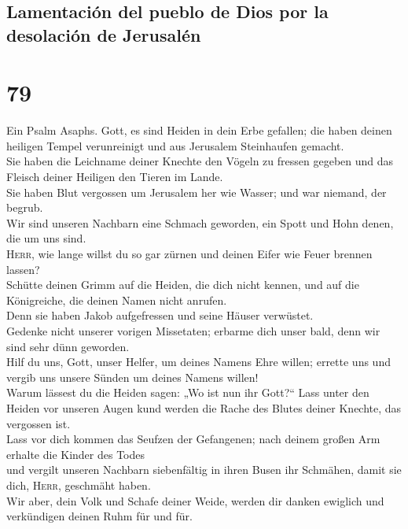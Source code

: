 \hypertarget{lamentaciuxf3n-del-pueblo-de-dios-por-la-desolaciuxf3n-de-jerusaluxe9n}{%
\subsection{Lamentación del pueblo de Dios por la desolación de
Jerusalén}\label{lamentaciuxf3n-del-pueblo-de-dios-por-la-desolaciuxf3n-de-jerusaluxe9n}}

\hypertarget{section-78}{%
\section{79}\label{section-78}}

 Ein Psalm Asaphs. Gott, es sind Heiden in dein Erbe
gefallen; die haben deinen heiligen Tempel verunreinigt und aus
Jerusalem Steinhaufen gemacht.\\
 Sie haben die Leichname deiner Knechte den Vögeln zu
fressen gegeben und das Fleisch deiner Heiligen den Tieren im Lande.\\
 Sie haben Blut vergossen um Jerusalem her wie Wasser; und
war niemand, der begrub.\\
 Wir sind unseren Nachbarn eine Schmach geworden, ein
Spott und Hohn denen, die um uns sind.\\
 \textsc{Herr}, wie lange willst du so gar zürnen und
deinen Eifer wie Feuer brennen lassen?\\
 Schütte deinen Grimm auf die Heiden, die dich nicht
kennen, und auf die Königreiche, die deinen Namen nicht anrufen.\\
 Denn sie haben Jakob aufgefressen und seine Häuser
verwüstet.\\
 Gedenke nicht unserer vorigen Missetaten; erbarme dich
unser bald, denn wir sind sehr dünn geworden.\\
 Hilf du uns, Gott, unser Helfer, um deines Namens Ehre
willen; errette uns und vergib uns unsere Sünden um deines Namens
willen!\\
 Warum lässest du die Heiden sagen: „Wo ist nun ihr
Gott?{}`` Lass unter den Heiden vor unseren Augen kund werden die Rache
des Blutes deiner Knechte, das vergossen ist.\\
 Lass vor dich kommen das Seufzen der Gefangenen; nach
deinem großen Arm erhalte die Kinder des Todes\\
 und vergilt unseren Nachbarn siebenfältig in ihren Busen
ihr Schmähen, damit sie dich, \textsc{Herr}, geschmäht haben.\\
 Wir aber, dein Volk und Schafe deiner Weide, werden dir
danken ewiglich und verkündigen deinen Ruhm für und für.

